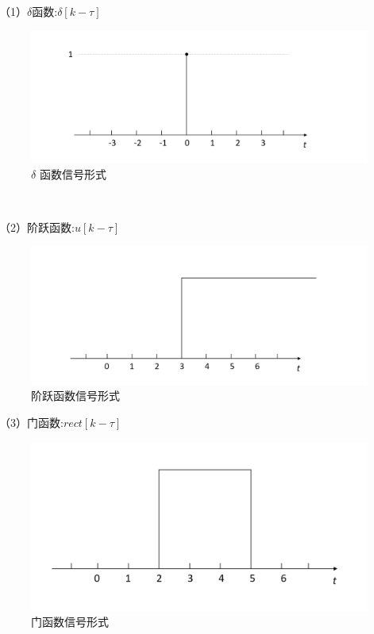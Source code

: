 \documentclass[UTF8]{ctexart}
\begin{document}
（1）$\delta $函数:$\delta [k-\tau ]$ \par
\begin{figure}[h]
    \centering         %
    \includegraphics[scale=0.35]{1.png}      
    \caption{$\delta $ 函数信号形式}
\end{figure}
\,\par
（2）阶跃函数:$u [k-\tau ]$ \par
\begin{figure}[h]
    \centering         %
    \includegraphics[scale=0.35]{2.jpg}
    \caption{阶跃函数信号形式}
\end{figure}
（3）门函数:$rect [k-\tau ]$ \par
\begin{figure}[h] 
    \centering         %
    \includegraphics[scale=0.35]{3.jpg}
    \caption{门函数信号形式}
\end{figure}
\end{document}
